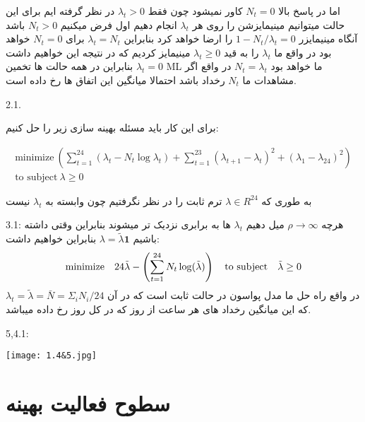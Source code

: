 اما در پاسخ بالا $ N_t = 0 $ کاور نمیشود چون فقط $ \lambda_t > 0 $ در نظر گرفته ایم برای این حالت میتوانیم مینیمایزشن را روی هر $ \lambda_t $ انجام دهیم اول فرض میکنیم $ N_t > 0 $ باشد آنگاه مینیمایزر $ 1 - N_t/\lambda_t = 0  $ را ارضا خواهد کرد بنابراین $ \lambda_t = N_t $ برای $ N_t = 0 $ خواهد بود در واقع ما $ \lambda_t $ را به قید $ \lambda_t \ge 0 $ مینیمایز کردیم که در نتیجه این خواهیم داشت $ \lambda_t = 0 $ بنابراین در همه حالت ها تخمین ML ما خواهد بود $ N_t = \lambda_t $ در واقع اگر مشاهدات ما $ N_t $ رخداد باشد احتمالا میانگین این اتفاق ها رخ داده است.

2.1.

برای این کار باید مسئله بهینه سازی زیر را حل کنیم:

\begin{equation}
\begin{aligned}
\text{minimize} \ \left( \sum_{t=1}^{24} ( \lambda_t - N_t \log \lambda_t ) + \sum_{t=1}^{23} (\lambda_{t+1} - \lambda_t)^2 + (\lambda_1 - \lambda_{24})^2 \right)\\
\textrm{to subject} \ \lambda \geq 0 
\end{aligned}
\end{equation}

 به طوری که $\lambda \in R^{24} $ ترم ثابت را در نظر نگرفتیم چون وابسته به $ \lambda_t $ نیست



3.1:
هرچه 
$ \rho \rightarrow \infty $ 
میل دهیم $ \lambda_t $ ها به برابری نزدیک تر میشوند بنابراین وقتی داشته باشیم 
$\lambda = \tilde{\lambda}\mathbf{1} $
بنابراین خواهیم داشت:
\begin{equation}
\text{minimize}\quad 24\tilde{\lambda} - \left(\sum_{t=1}^{24}N_t \log(\tilde{\lambda})\right)\\
\quad \text{to subject} \quad \tilde{\lambda} \geq 0
\end{equation}
در واقع راه حل ما مدل پواسون در حالت ثابت است که در آن
$ \lambda_t = \tilde{\lambda} = \bar{N} = \Sigma_i N_i/24 $ 
که این میانگین رخداد های هر ساعت از روز که در کل روز رخ داده میباشد.

5,4.1:

 \begin{center}
    \texttt{[image: 1.4\&5.jpg]}
\end{center}

\newpage
\huge
\section{سطوح فعالیت بهینه}
\large

